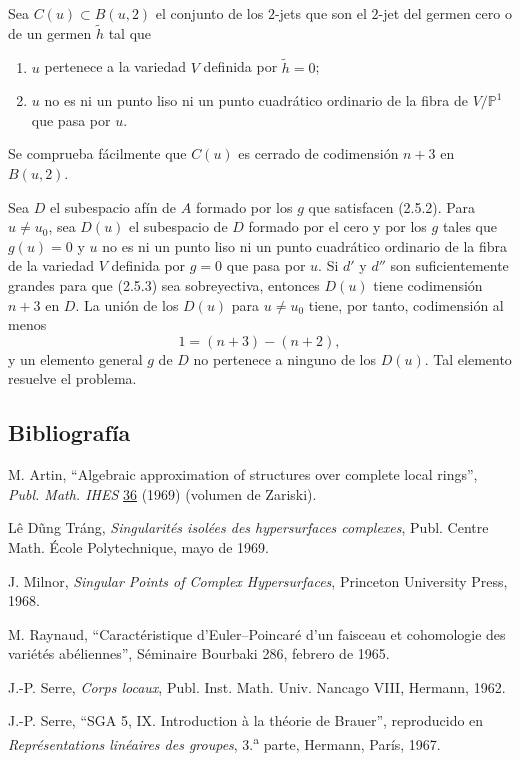 Sea $C(u)\subset B(u,2)$ el conjunto de los $2$-jets que son el
$2$-jet del germen cero o de un germen $\widetilde h$ tal que
\begin{enumerate}
\item[(a)] $u$ pertenece a la variedad $V$ definida por
$\widetilde h=0$;
\item[(b)] $u$ no es ni un punto liso ni un punto cuadrático ordinario
de la fibra de $V/\mathbb P^1$ que pasa por $u$.
\end{enumerate}
Se comprueba fácilmente que $C(u)$ es cerrado de codimensión $n+3$
en $B(u,2)$.

Sea $D$ el subespacio afín de $A$ formado por los $g$ que satisfacen
(2.5.2). Para $u\ne u_0$, sea $D(u)$ el subespacio de $D$ formado por
el cero y por los $g$ tales que $g(u)=0$ y $u$ no es ni un punto liso
ni un punto cuadrático ordinario de la fibra de la variedad $V$
definida por $g=0$ que pasa por $u$. Si $d'$ y $d''$ son
suficientemente grandes para que (2.5.3) sea sobreyectiva, entonces
$D(u)$ tiene codimensión $n+3$ en $D$. La unión de los $D(u)$ para
$u\ne u_0$ tiene, por tanto, codimensión al menos
\[
1=(n+3)-(n+2),
\]
y un elemento general $g$ de $D$ no pertenece a ninguno de los
$D(u)$. Tal elemento resuelve el problema.

\pageoriginale

\subsection*{Bibliografía}

\begin{enumerate}[label={[\arabic*]},leftmargin=3em]
\item M. Artin, ``Algebraic approximation of structures over complete
local rings'', \emph{Publ. Math. IHES} \underline{36} (1969)
(volumen de Zariski).
\item Lê Dũng Tráng, \emph{Singularités isolées des hypersurfaces
complexes}, Publ. Centre Math. École Polytechnique, mayo de 1969.
\item J. Milnor, \emph{Singular Points of Complex Hypersurfaces},
Princeton University Press, 1968.
\item M. Raynaud, ``Caractéristique d'Euler--Poincaré d'un faisceau et
cohomologie des variétés abéliennes'', Séminaire Bourbaki 286,
febrero de 1965.
\item J.-P. Serre, \emph{Corps locaux}, Publ. Inst. Math. Univ.
Nancago VIII, Hermann, 1962.
\item J.-P. Serre, ``SGA 5, IX. Introduction à la théorie de Brauer'',
reproducido en \emph{Représentations linéaires des groupes},
3.\textsuperscript{a} parte, Hermann, París, 1967.
\end{enumerate}

